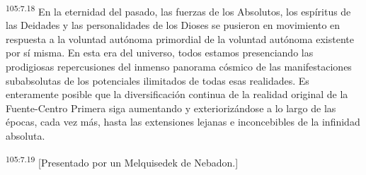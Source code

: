 \par
\textsuperscript{105:7.18} En la eternidad del pasado, las fuerzas de los Absolutos, los espíritus de las Deidades y las personalidades de los Dioses se pusieron en movimiento en respuesta a la voluntad autónoma primordial de la voluntad autónoma existente por sí misma. En esta era del universo, todos estamos presenciando las prodigiosas repercusiones del inmenso panorama cósmico de las manifestaciones subabsolutas de los potenciales ilimitados de todas esas realidades. Es enteramente posible que la diversificación continua de la realidad original de la Fuente-Centro Primera siga aumentando y exteriorizándose a lo largo de las épocas, cada vez más, hasta las extensiones lejanas e inconcebibles de la infinidad absoluta.

\par
\textsuperscript{105:7.19} [Presentado por un Melquisedek de Nebadon.]